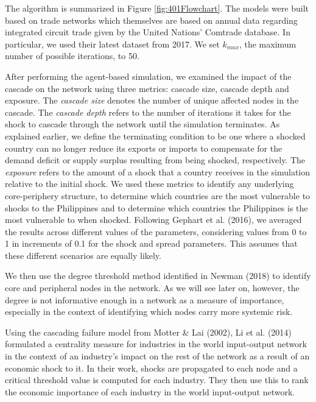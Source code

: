 \documentclass[12pt,letterpaper]{report}
\begin{document}
	The algorithm is summarized in Figure \ref{fig:401Flowchart}. The models were built based on trade networks which themselves are based on annual data regarding integrated circuit trade given by the United Nations' Comtrade database. In particular, we used their latest dataset from 2017. We set $k_{max}$, the maximum number of possible iterations, to 50. 
	
	After performing the agent-based simulation, we examined the impact of the cascade on the network using three metrics: cascade size, cascade depth and exposure. The \textit{cascade size } denotes the number of unique affected nodes in the cascade. The \textit{cascade depth} refers to the number of iterations it takes for the shock to cascade through the network until the simulation terminates. \cite{losercs224w} As explained earlier, we define the terminating condition to be one where a shocked country can no longer reduce its exports or imports to compensate for the demand deficit or supply surplus resulting from being shocked, respectively. The \textit{exposure} refers to the amount of a shock that a country receives in the simulation relative to the initial shock. \cite{gephart2016vulnerability} We used these metrics to identify any underlying core-periphery structure, to determine which countries are the most vulnerable to shocks to the Philippines and to determine which countries the Philippines is the most vulnerable to when shocked. Following Gephart et al. (2016), we averaged the results across different values of the parameters, considering values from 0 to 1 in increments of 0.1 for the shock and spread parameters. This assumes that these different scenarios are equally likely. 
	
	We then use the degree threshold method identified in Newman (2018) to identify core and peripheral nodes in the network. As we will see later on, however, the degree is not informative enough in a network as a measure of importance, especially in the context of identifying which nodes carry more systemic risk.
	
	Using the cascading failure model from Motter \& Lai (2002), Li et al. (2014) formulated a centrality measure for industries in the world input-output network in the context of an industry's impact on the rest of the network as a result of an economic shock to it. In their work, shocks are propagated to each node and a critical threshold value is computed for each industry. They then use this to rank the economic importance of each industry in the world input-output network. 
	
\end{document}

